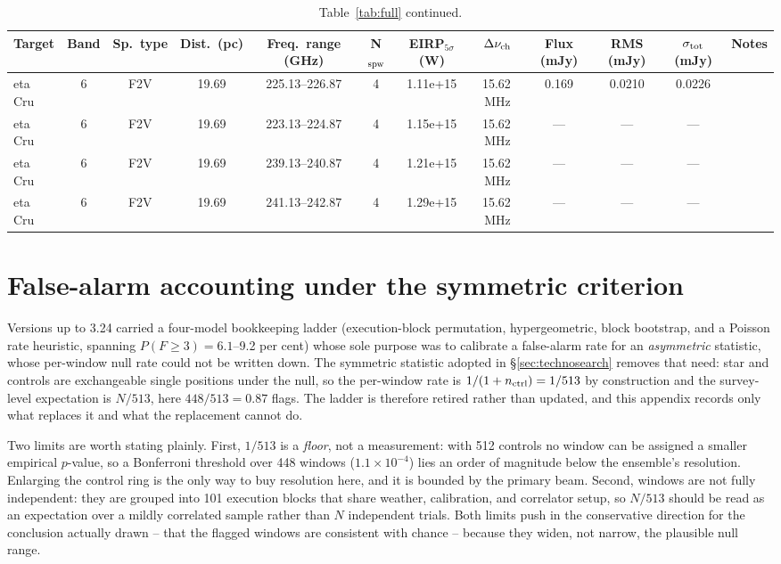 \documentclass{openjournal}
\begin{document}
\begin{table}
\centering
\scriptsize
\setlength{\tabcolsep}{2pt}
\caption{Table~\ref{tab:full} continued.}
\label{tab:full8}
\begin{tabularx}{\textwidth}{@{}l c c c c c c c c c c X@{}}
\hline
Target & Band & Sp.\ type & Dist.\ (pc) & Freq.\ range (GHz) & N$_{\rm spw}$ & EIRP$_{5\sigma}$ (W) & $\Delta\nu_{\rm ch}$ & Flux (mJy) & RMS (mJy) & $\sigma_{\rm tot}$ (mJy) & Notes \\
\hline
 eta Cru & 6 & F2V & 19.69 & 225.13--226.87 & 4 & 1.11e+15 & 15.62\,MHz & 0.169 & 0.0210 & 0.0226 &  \\
 eta Cru & 6 & F2V & 19.69 & 223.13--224.87 & 4 & 1.15e+15 & 15.62\,MHz & --- & --- & --- &  \\
 eta Cru & 6 & F2V & 19.69 & 239.13--240.87 & 4 & 1.21e+15 & 15.62\,MHz & --- & --- & --- &  \\
 eta Cru & 6 & F2V & 19.69 & 241.13--242.87 & 4 & 1.29e+15 & 15.62\,MHz & --- & --- & --- &  \\
\hline
\end{tabularx}
\end{table}

\section{False-alarm accounting under the symmetric criterion}
\label{app:falsealarm}

Versions up to 3.24 carried a four-model bookkeeping ladder
(execution-block permutation, hypergeometric, block bootstrap, and a
Poisson rate heuristic, spanning $P(F{\geq}3)=6.1$--9.2 per cent) whose
sole purpose was to calibrate a false-alarm rate for an
\emph{asymmetric} statistic, whose per-window null rate could not be
written down. The symmetric statistic adopted in \S\ref{sec:technosearch}
removes that need: star and controls are exchangeable single positions
under the null, so the per-window rate is $1/(1+n_{\rm ctrl})=1/513$ by
construction and the survey-level expectation is $N/513$, here
$448/513=0.87$ flags. The ladder is therefore retired rather than
updated, and this appendix records only what replaces it and what the
replacement cannot do.

Two limits are worth stating plainly. First, $1/513$ is a
\emph{floor}, not a measurement: with 512 controls no window can be
assigned a smaller empirical $p$-value, so a Bonferroni threshold over
448 windows ($1.1\times10^{-4}$) lies an order of magnitude below the
ensemble's resolution. Enlarging the control ring is the only way to
buy resolution here, and it is bounded by the primary beam. Second,
windows are not fully independent: they are grouped into 101 execution
blocks that share weather, calibration, and correlator setup, so
$N/513$ should be read as an expectation over a mildly correlated
sample rather than $N$ independent trials. Both limits push in the
conservative direction for the conclusion actually drawn -- that the
flagged windows are consistent with chance -- because they widen, not
narrow, the plausible null range.
\end{document}
